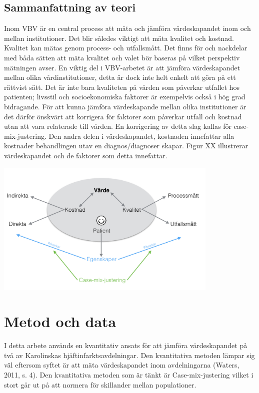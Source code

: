 \subsection{Sammanfattning av teori}

Inom VBV är en central process att mäta och jämföra värdeskapandet inom och mellan institutioner. Det blir således viktigt att mäta kvalitet och kostnad. Kvalitet kan mätas genom process- och utfallsmått. Det finns för och nackdelar med båda sätten att mäta kvalitet och valet bör baseras på vilket perspektiv mätningen avser. En viktig del i VBV-arbetet är att jämföra värdeskapandet mellan olika vårdinstitutioner, detta är dock inte helt enkelt att göra på ett rättvist sätt. Det är inte bara kvaliteten på vården som påverkar utfallet hos patienten; livsstil och socioekonomiska faktorer är exempelvis också i hög grad bidragande. För att kunna jämföra värdeskapande mellan olika institutioner är det därför önskvärt att korrigera för faktorer som påverkar utfall och kostnad utan att vara relaterade till vården. En korrigering av detta slag kallas för case-mix-justering. Den andra delen i värdeskapandet, kostnaden innefattar alla kostnader behandlingen utav en diagnos/diagnoser skapar. Figur XX illustrerar värdeskapandet och de faktorer som detta innefattar.

\noindent\begin{minipage}{\textwidth}
\centering
\includegraphics[width=0.8\textwidth]{varde}
\label{fig:varde}            
\end{minipage}

\section{Metod och data}

I detta arbete används en kvantitativ ansats för att jämföra värdeskapandet på två av Karolinskas hjäftinfarktsavdelningar. Den kvantitativa metoden lämpar sig väl eftersom syftet är att mäta värdeskapandet inom avdelningarna (Waters, 2011, s. 4). Den kvantitativa metoden som är tänkt är Case-mix-justering vilket i stort går ut på att normera för skillander mellan populationer. 

